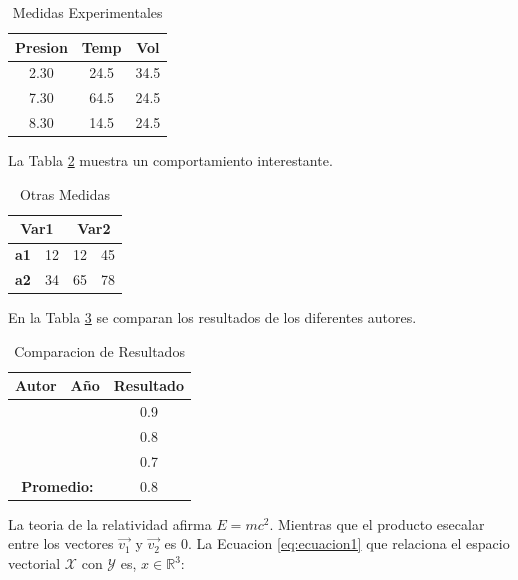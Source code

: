 \documentclass[12pt]{report} %
\begin{document}
\begin{table}[htbp]
    \centering
    \caption{Medidas Experimentales}
    \begin{tabular}{|ccc|}
        \hline
        \textbf{Presion} & \textbf{Temp} & \textbf{Vol}  \\ \hline
         2.30   &  24.5 & 34.5 \\
         7.30   &  64.5 & 24.5 \\
         8.30   &  14.5 & 24.5 \\ \hline
    \end{tabular}
    \label{tab:mis_mediciones}
\end{table}{}

La Tabla \ref{tab:mis_otras_mediciones} muestra un comportamiento interestante.

\begin{table}[h!]
\centering
\caption{Otras Medidas}
\begin{tabular}{ll|ll}
\multicolumn{2}{c|}{\textbf{Var1}} & \multicolumn{2}{c}{\textbf{Var2}} \\ \hline
\textbf{a1}          & 12          & 12              & 45              \\
\textbf{a2}          & 34          & 65              & 78             
\end{tabular}
\label{tab:mis_otras_mediciones}
\end{table}

En la Tabla \ref{tab:comparacion} se comparan los resultados de los diferentes autores. 

\begin{table}[h!]
\centering
\caption{Comparacion de Resultados}
\begin{tabular}{ccc}
\textbf{Autor}    & \textbf{Año}    & \textbf{Resultado} \\ \hline
    \citeauthor{priandana2018backprop} &    \citeyear{priandana2018backprop} & 0.9                \\
    \citeauthor{dawkins_biology_2016}  &    \citeyear{dawkins_biology_2016}  & 0.8                \\
    \citeauthor{nogueira2017image}     &    \citeyear{nogueira2017image}     & 0.7                \\ \hline
\multicolumn{2}{c}{\textbf{Promedio:}} & 0.8               
\end{tabular}
\label{tab:comparacion}
\end{table}

La teoria de la relatividad afirma $E = mc^{2}$. Mientras que el producto esecalar entre los vectores $\vec{v_{1}}$ y $\vec{v_{2}}$ es 0. La Ecuacion \eqref{eq:ecuacion1} que relaciona el espacio vectorial $\mathcal{X}$ con $\mathcal{Y}$ es, $x \in \mathbb{R}^{3}$:
\end{document}
